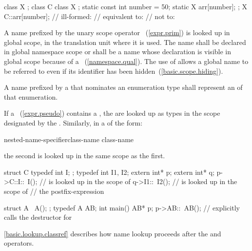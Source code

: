 \begin{codeblock}
class X { };
class C {
  class X { };
  static const int number = 50;
  static X arr[number];
};
X C::arr[number];   // ill-formed:
                    // equivalent to:  
                    // not to:  
\end{codeblock}
\exitexample 

\pnum
{}%
A name prefixed by the unary scope operator \tcode{::}~(\ref{expr.prim})
is looked up in global scope, in the translation unit where it is used.
The name shall be declared in global namespace scope or shall be a name
whose declaration is visible in global scope because of a
~(\ref{namespace.qual}). The use of \tcode{::}
allows a global name to be referred to even if its identifier has been
hidden~(\ref{basic.scope.hiding}).

\pnum
A name prefixed by a  that
nominates an enumeration type shall represent an 
of that enumeration.

\pnum
If a ~(\ref{expr.pseudo}) contains a
, the  are looked
up as types in the scope designated by the
. Similarly, in a
 of the form:

\begin{ncbnf}
nested-name-specifier\opt class-name \terminal{::} \terminal{\tilde} class-name
\end{ncbnf}

the second  is looked up in the same scope as the
first. \enterexample

\begin{codeblock}
struct C {
  typedef int I;
};
typedef int I1, I2;
extern int* p;
extern int* q;
p->C::I::~I();      //  is looked up in the scope of 
q->I1::~I2();       //  is looked up in the scope of
                    // the postfix-expression

struct A {
  ~A();
};
typedef A AB;
int main() {
  AB* p;
  p->AB::~AB();     // explicitly calls the destructor for 
}
\end{codeblock}
\exitexample \enternote \ref{basic.lookup.classref} describes how name
lookup proceeds after the  and \tcode{->} operators. \exitnote

